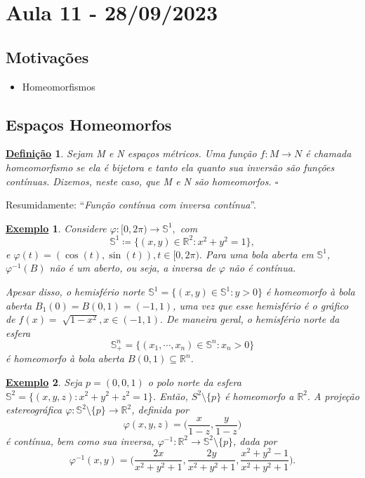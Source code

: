 \documentclass{article}
\newtheorem*{def*}{\underline{Defini\c c\~ao}}
\newtheorem{example}{\underline{Exemplo}}
\begin{document}
\section{Aula 11 - 28/09/2023}
\subsection{Motivações}
\begin{itemize}
  \item Homeomorfismos
\end{itemize}
\subsection{Espaços Homeomorfos}
 \begin{def*}
   Sejam M e N espaços métricos. Uma função \(f:M\rightarrow N\) é chamada homeomorfismo se
ela é bijetora e tanto ela quanto sua inversão são funções contínuas. Dizemos, neste caso, que M e N
são homeomorfos. \(\square\)
 \end{def*}   
  Resumidamente: ``\textit{Função contínua com inversa contínua}''.
\begin{example}
  Considere \(\varphi :[0, 2\pi )\rightarrow \mathbb{S}^{1},\) com 
    \[
      \mathbb{S}^{1}\coloneqq \{(x, y)\in \mathbb{R}^{2}: x^{2}+y^{2}=1\},
    \]
e \(\varphi (t) = (\cos{(t)}, \sin{(t)}), t\in[0, 2\pi ).\) Para uma bola aberta em 
 \(\mathbb{S}^{1}\), \(\varphi ^{-1}(B)\) não é um aberto, ou seja, a inversa
 de \(\varphi \) não é contínua.

  Apesar disso, o hemisfério norte \(\mathbb{S}^{1}=\{(x, y)\in \mathbb{S}^{1}: y > 0\}\) é
homeomorfo à bola aberta \(B_{1}(0) = B(0, 1) = (-1, 1)\), uma vez que esse hemisfério é o gráfico
de \(f(x) = \sqrt[]{1-x^{2}}, x\in (-1, 1).\) De maneira geral, o hemisfério norte 
da esfera 
  \[
    \mathbb{S}_{+}^{n} = \{(x_{1}, \cdots, x_{n})\in \mathbb{S}^{n}: x_{n}>0\}
  \]
  é homeomorfo à bola aberta \(B(0, 1)\subseteq{\mathbb{R}^{n}}\).
\end{example}
\begin{example}
  Seja \(p=(0, 0, 1)\) o polo norte da esfera \(\mathbb{S}^{2}=\{(x, y, z): x^{2}+y^{2}+z^{2}=1\}\). Então, 
 \(S^{2}\setminus\{p\}\) é homeomorfo a \(\mathbb{R}^{2}.\) A projeção estereográfica
 \(\varphi :\mathbb{S}^{2}\setminus\{p\}\rightarrow \mathbb{R}^{2}\), definida por 
   \[
     \varphi (x, y, z) = \biggl(\frac{x}{1-z}, \frac{y}{1-z}\biggr)
   \]
é contínua, bem como sua inversa, \(\varphi ^{-1}:\mathbb{R}^{2}\rightarrow \mathbb{S}^{2}\setminus\{p\}\), dada por 
  \[
    \varphi ^{-1}(x, y) = \biggl(\frac{2x}{x^{2}+y^{2}+1}, \frac{2y}{x^{2}+y^{2}+1}, \frac{x^{2}+y^{2}-1}{x^{2}+y^{2}+1}\biggr).
  \]
\end{example}
\end{document}
